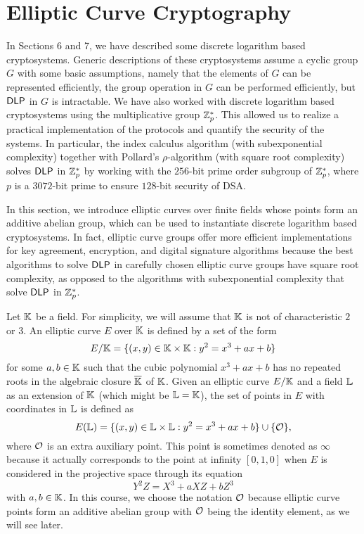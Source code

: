 \section{Elliptic Curve Cryptography}
In Sections 6 and 7, we have described some discrete logarithm based cryptosystems.
Generic descriptions of these cryptosystems assume a cyclic group $G$ with some 
basic assumptions, namely that the elements of $G$ can be represented efficiently,
the group operation in $G$ can be performed efficiently, but ${\sf DLP}$ in $G$ is 
intractable. We have also worked with discrete logarithm based cryptosystems 
using the multiplicative group $\mathbb{Z}_p^*$. This allowed us to realize a 
practical implementation of the protocols and quantify the security of the 
systems. In particular, the index calculus algorithm (with subexponential
complexity) together with Pollard's $\rho$-algorithm (with square root 
complexity) solves ${\sf DLP}$ in $\mathbb{Z}_p^*$ by working with the $256$-bit prime 
order subgroup of $\mathbb{Z}_p^*$, where $p$ is a $3072$-bit prime to ensure 
$128$-bit security of DSA. 

In this section, we introduce elliptic curves over finite fields whose points 
form an additive abelian group, which can be used to instantiate discrete 
logarithm based cryptosystems. In fact, elliptic curve groups offer more 
efficient implementations for key agreement, encryption, and digital signature 
algorithms because the best algorithms to solve ${\sf DLP}$ in carefully chosen 
elliptic curve groups have square root complexity, as opposed to the algorithms 
with subexponential complexity that solve ${\sf DLP}$ in $\mathbb{Z}_p^*$. 

Let $\mathbb{K}$ be a field. For simplicity, we will assume that $\mathbb{K}$ is not of 
characteristic $2$ or $3$. An elliptic curve $E$ over $\mathbb{K}$ is defined by 
a set of the form 
\[ E/\mathbb{K} = \{(x, y) \in \mathbb{K} \times \mathbb{K} : y^2 = x^3 + ax + b\} \] 
for some $a, b \in \mathbb{K}$ such that the cubic polynomial $x^3 + ax + b$
has no repeated roots in the algebraic closure $\overline{\mathbb{K}}$ of $\mathbb{K}$.
Given an elliptic curve $E/\mathbb{K}$ and a field $\mathbb{L}$ as an extension of $\mathbb{K}$
(which might be $\mathbb{L} = \mathbb{K}$), the set of points in $E$ with coordinates 
in $\mathbb{L}$ is defined as 
\[ E(\mathbb{L}) = \{(x, y) \in \mathbb{L} \times \mathbb{L} : y^2 = x^3 + ax + b\} \cup \{\cal O\}, \] 
where ${\cal O}$ is an extra auxiliary point. This point is sometimes 
denoted as $\infty$ because it actually corresponds to the point at infinity 
$[0, 1, 0]$ when $E$ is considered in the projective space through its equation 
\[ Y^2 Z = X^3 + aXZ + bZ^3 \] 
with $a, b \in \mathbb{K}$. In this course, we choose the notation ${\cal O}$ because 
elliptic curve points form an additive abelian group with ${\cal O}$ 
being the identity element, as we will see later. 

